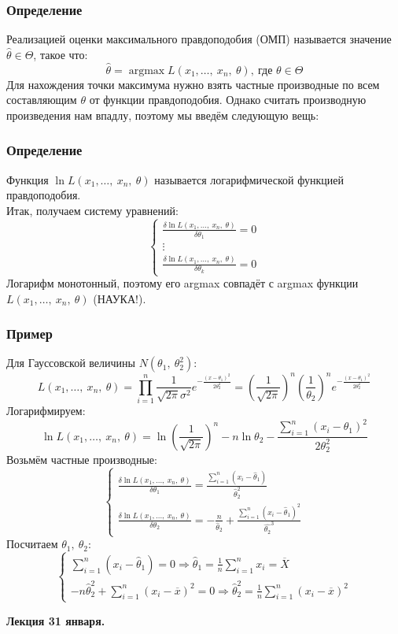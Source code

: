 \documentclass[12pt, a4paper]{article}
\newcommand{\sion}{\sum\limits_{i = 1}^{n}}
\begin{document}
\subsubsection*{Определение}
Реализацией оценки максимального правдоподобия (ОМП) называется значение $\hat{\theta} \in \Theta$, такое что:
\[\hat{\theta} = \operatorname{argmax} L(x_1,\dots,\ x_n,\ \theta),\ \text{где }\theta \in \Theta\]
Для нахождения точки максимума нужно взять частные производные по всем составляющим $\theta$ от функции правдоподобия. Однако считать производную произведения нам впадлу, поэтому мы введём следующую вещь:
\subsubsection*{Определение}
Функция $\ln L(x_1,\dots,\ x_n,\ \theta)$ называется логарифмической функцией правдоподобия.\\
Итак, получаем систему уравнений:
\[\begin{cases}
    \frac{\delta \ln L(x_1,\dots,\ x_n,\ \theta)}{\delta \theta_1} = 0\\
    \vdots\\
    \frac{\delta \ln L(x_1,\dots,\ x_n,\ \theta)}{\delta \theta_k} = 0
\end{cases}\]
Логарифм монотонный, поэтому его argmax совпадёт с argmax функции $L(x_1,\dots,\ x_n,\ \theta)$ (НАУКА!).
\subsubsection*{Пример}
Для Гауссовской величины $N(\theta_1,\ \theta_2^2)$:
\[L(x_1,\dots,\ x_n,\ \theta) = \prod\limits_{i = 1}^{n} \frac{1}{\sqrt{2\pi}\sigma^2} e^{-\frac{(x - \theta_1)^2}{2\theta_2^2}} = \left( \frac{1}{\sqrt{2\pi}} \right)^n \left( \frac{1}{\theta_2} \right)^n e^{-\frac{(x - \theta_1)^2}{2\theta_2^2}}\]
Логарифмируем:
\[\ln L(x_1,\dots,\ x_n,\ \theta) = \ln \left( \frac{1}{\sqrt{2\pi}} \right)^n - n\ln \theta_2 - \frac{\sion (x_i - \theta_1)^2}{2\theta_2^2}\]
Возьмём частные производные:
\[\begin{cases}
    \frac{\delta \ln L(x_1,\dots,\ x_n,\ \theta)}{ \delta \theta_1} = \frac{\sion (x_i - \hat{\theta}_1)}{\hat{\theta}_2^2}\\
    \frac{\delta \ln L(x_1,\dots,\ x_n,\ \theta)}{\delta \theta_2} = -\frac{n}{\hat{\theta}_2} + \frac{\sion (x_i - \hat{\theta}_1)^2}{\hat{\theta_2}^3}
\end{cases}\]
Посчитаем $\theta_1,\ \theta_2$:
\[\begin{cases}
    \sion (x_i - \hat{\theta}_1) = 0 \Rightarrow \hat{\theta}_1 = \frac{1}{n} \sion x_i = \overline{X}\\
    -n\hat{\theta}_2^2 + \sion (x_i - \overline{x})^2 = 0 \Rightarrow \hat{\theta}_2^2 = \frac{1}{n} \sion (x_i - \overline{x})^2
\end{cases}\]
\begin{center}
    \bf Лекция 31 января.
\end{center}
\end{document}
